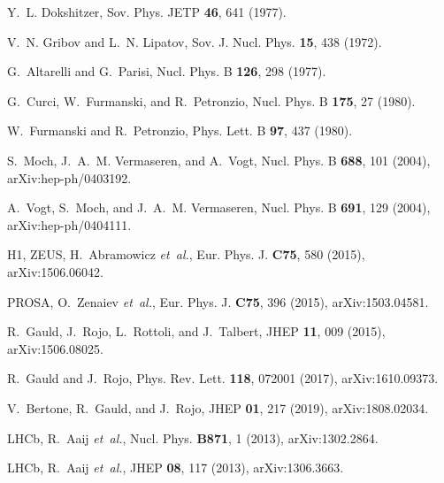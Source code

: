 \documentclass[a4paper,11pt]{article}
\begin{document}
\begin{thebibliography}{99}

Y.~L. Dokshitzer,
\newblock Sov. Phys. JETP {\bf 46}, 641 (1977).

V.~N. Gribov and L.~N. Lipatov,
\newblock Sov. J. Nucl. Phys. {\bf 15}, 438 (1972).

G.~Altarelli and G.~Parisi,
\newblock Nucl. Phys. B {\bf 126}, 298 (1977).

G.~Curci, W.~Furmanski, and R.~Petronzio,
\newblock Nucl. Phys. B {\bf 175}, 27 (1980).

W.~Furmanski and R.~Petronzio,
\newblock Phys. Lett. B {\bf 97}, 437 (1980).

S.~Moch, J.~A.~M. Vermaseren, and A.~Vogt,
\newblock Nucl. Phys. B {\bf 688}, 101 (2004), arXiv:hep-ph/0403192.

A.~Vogt, S.~Moch, and J.~A.~M. Vermaseren,
\newblock Nucl. Phys. B {\bf 691}, 129 (2004), arXiv:hep-ph/0404111.

H1, ZEUS, H.~Abramowicz {\em et~al.},
\newblock Eur. Phys. J. {\bf C75}, 580 (2015), arXiv:1506.06042.

PROSA, O.~Zenaiev {\em et~al.},
\newblock Eur. Phys. J. {\bf C75}, 396 (2015), arXiv:1503.04581.

R.~Gauld, J.~Rojo, L.~Rottoli, and J.~Talbert,
\newblock JHEP {\bf 11}, 009 (2015), arXiv:1506.08025.

R.~Gauld and J.~Rojo,
\newblock Phys. Rev. Lett. {\bf 118}, 072001 (2017), arXiv:1610.09373.

V.~Bertone, R.~Gauld, and J.~Rojo,
\newblock JHEP {\bf 01}, 217 (2019), arXiv:1808.02034.

LHCb, R.~Aaij {\em et~al.},
\newblock Nucl. Phys. {\bf B871}, 1 (2013), arXiv:1302.2864.

LHCb, R.~Aaij {\em et~al.},
\newblock JHEP {\bf 08}, 117 (2013), arXiv:1306.3663.


\end{thebibliography}
\end{document}
